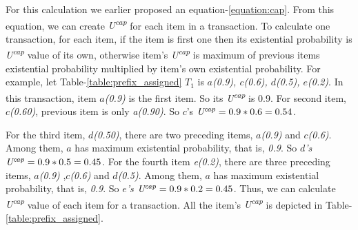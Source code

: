 \documentclass[conference]{IEEEtran}
\begin{document}
For this calculation we earlier proposed an equation-\ref{equation:cap}. From this equation, we can create \emph{U\textsuperscript{cap}} for each item in a transaction. To calculate one transaction, for each item, if the item is first one then its existential probability is \emph{U\textsuperscript{cap}} value of its own, otherwise item's \emph{U\textsuperscript{cap}} is maximum of previous items existential probability multiplied by item's own existential probability. For example, let Table-\ref{table:prefix_assigned} $T_{1}$ is \emph{$a$(0.9), $c$(0.6), $d$(0.5), $e$(0.2)}. In this transaction, item \emph{$a$(0.9)} is the first item. So its \emph{U\textsuperscript{cap}} is 0.9. For second item, \emph{$c$(0.60)}, previous item is only \emph{a(0.90)}. So $c$'s $\emph{U\textsuperscript{cap}} = 0.9*0.6 = 0.54$.

For the third item, \emph{$d$(0.50)}, there are two preceding items, \emph{$a$(0.9)} and \emph{$c$(0.6)}. Among them, \emph{$a$} has maximum existential probability, that is, \emph{0.9}. So \emph{$d$'s} $\emph{U\textsuperscript{cap}} = 0.9*0.5 = 0.45$. For the fourth item \emph{e(0.2)}, there are three preceding items, \emph{$a$(0.9)} ,\emph{$c$(0.6)} and \emph{$d$(0.5)}. Among them, \emph{$a$} has maximum existential probability, that is, \emph{0.9}. So \emph{$e$'s} $\emph{U\textsuperscript{cap}} = 0.9*0.2 = 0.45$. Thus, we can calculate \emph{U\textsuperscript{cap}} value of each item for a transaction. All the item's \emph{U\textsuperscript{cap}} is depicted in Table-\ref{table:prefix_assigned}.
\end{document}
